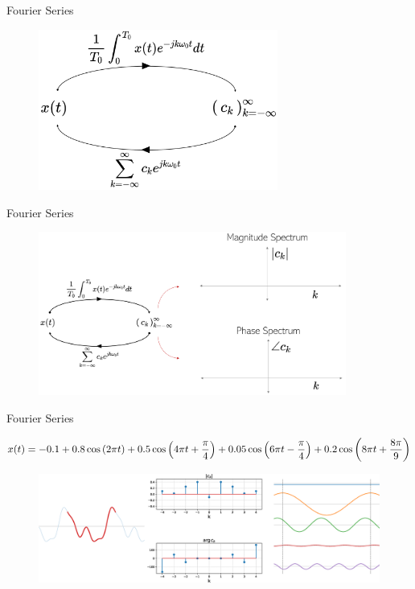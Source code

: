 \documentclass[aspectratio=169]{beamer}
\def\lp{\ensuremath\left(}
\def\rp{\ensuremath\right)}
\begin{document}
\begin{frame}[t]{Fourier Series}
\begin{figure}
  \includegraphics[width=0.7\textwidth]{img/fourierseries.png}
\end{figure}
\end{frame}


\begin{frame}[t]{Fourier Series}
\begin{figure}
  \includegraphics[width=0.9\textwidth]{img/fsspectrum.png}
\end{figure}
\end{frame}


\begin{frame}[t]{Fourier Series}
\vspace{-0.5cm}
\begin{small}
\[ x(t) = -0.1 + 0.8 \cos\lp 2\pi t\rp + 0.5 \cos\lp 4\pi t + \frac{\pi}{4}\rp + 0.05 \cos\lp 6\pi t - \frac{\pi}{4}\rp + 0.2 \cos\lp 8\pi t + \frac{8\pi}{9}\rp \]
\end{small}

\begin{figure}
  \includegraphics[width=1.0\textwidth]{img/fs-demo.eps}
  \end{figure}
\end{frame}
\end{document}
